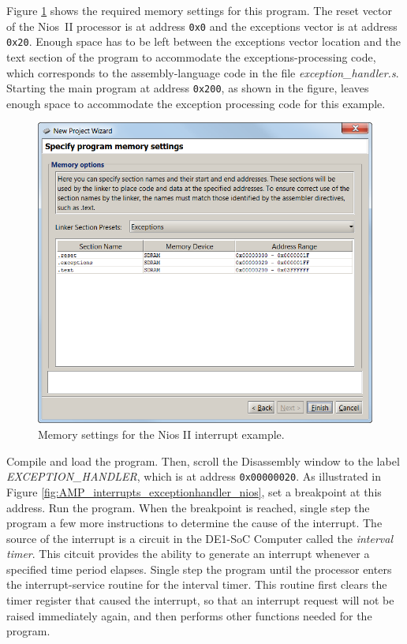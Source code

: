 \documentclass[11pt, twoside, pdftex]{article}
\begin{document}
 
Figure \ref{fig:NPW_interrupts_memorysettings_nios} shows the required memory settings for this program.
The reset vector of the Nios~II processor is at address 
\texttt{0x0} and the exceptions vector is at address 
\texttt{0x20}. Enough space has to be left between the exceptions
vector location and the text section of the program to
accommodate the exceptions-processing code,
which corresponds to the assembly-language code in the 
file {\it exception\_handler.s}. 
Starting the main program at address \texttt{0x200}, as shown
in the figure, leaves enough space to accommodate the exception
processing code for this example.

\begin{figure}[H]
   \begin{center}
      \includegraphics[scale=1]{screenshots/figure51.png}
   \end{center}
   \caption{Memory settings for the Nios II interrupt example.} 
   \label{fig:NPW_interrupts_memorysettings_nios}
\end{figure}

Compile and load the program. Then, scroll the Disassembly window
to the label {\it EXCEPTION\_HANDLER}, which is at
address \texttt{0x00000020}.  
As illustrated in Figure \ref{fig:AMP_interrupts_exceptionhandler_nios}, set a breakpoint at this address.
Run the program. When the breakpoint is reached, single step
the program a few more instructions to determine the cause of the
interrupt. The source of the interrupt is a circuit in the 
DE1-SoC Computer called the {\it interval timer}. This 
citcuit provides the ability to generate an interrupt whenever a
specified time period elapses. Single step the program until the
processor enters the interrupt-service routine for the interval
timer. This routine first clears the timer register that caused
the interrupt, so that an interrupt request will not be raised
immediately again, and then performs other functions needed for
the program.
\end{document}
